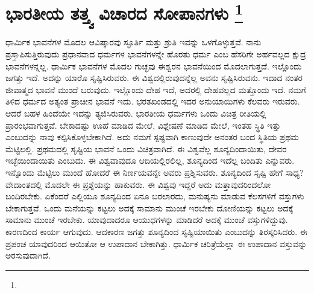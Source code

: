 
\chapter[ಭಾರತೀಯ ತತ್ತ್ವ ವಿಚಾರದ ಸೋಪಾನಗಳು ]{ಭಾರತೀಯ ತತ್ತ್ವ ವಿಚಾರದ ಸೋಪಾನಗಳು \protect\footnote{}}

ಧಾರ್ಮಿಕ ಭಾವನೆಗಳ ಮೊದಲ ಆವಿಷ್ಕಾರವು ಸ್ಫೂರ್ತಿ ಮತ್ತು ಶ್ರುತಿ ಇವನ್ನು ಒಳಗೊಳ್ಳುತ್ತವೆ. ನಾನು ಪ್ರಸ್ತಾಪಿಸುತ್ತಿರುವುದು ಪ್ರಧಾನವಾದ ಧರ್ಮಗಳ ಭಾವನೆಗಳನ್ನೇ ಹೊರತು ಧರ್ಮ ಎಂಬ ಹೆಸರಿಗೇ ಅರ್ಹವಲ್ಲದ ಕ್ಷುದ್ರ ಭಾವನೆಗಳನ್ನಲ್ಲ. ಧಾರ್ಮಿಕ ಭಾವನೆಗಳ ಮೊದಲ ಗುಚ್ಛವು ಈಶ್ವರನ ಭಾವನೆಯಿಂದ ಮೊದಲಾಗುತ್ತದೆ. ಇಲ್ಲೊಂದು ಜಗತ್ತು ಇದೆ. ಅದನ್ನು ಯಾರೊ ಸೃಷ್ಟಿಸಿರುವರು. ಈ ವಿಶ್ವದಲ್ಲಿರುವುದನ್ನೆಲ್ಲ ಅವನು ಸೃಷ್ಟಿಸಿರುವನು. ಇದಾದ ನಂತರ ಜೀವಾತ್ಮದ ಭಾವನೆ ಮುಂದೆ ಬರುವುದು. ಇಲ್ಲೊಂದು ದೇಹ ಇದೆ, ಅದರಲ್ಲಿ ದೇಹವಲ್ಲದ ಮತ್ತೊಂದು ಇದೆ. ನಮಗೆ ತಿಳಿದ ಧರ್ಮದ ಅತ್ಯಂತ ಪ್ರಾಚೀನ ಭಾವನೆ ಇದು. ಭರತಖಂಡದಲ್ಲಿ ಇದರ ಅನುಯಾಯಿಗಳು ಕೆಲವರು ಇರುವರು. ಆದರೆ ಬಹಳ ಹಿಂದೆಯೇ ಇದನ್ನು ತ್ಯಜಿಸಿರುವರು. ಭಾರತೀಯ ಧರ್ಮಗಳು ಒಂದು ವಿಚಿತ್ರ ರೀತಿಯಲ್ಲಿ ಪ್ರಾರಂಭವಾಗುತ್ತವೆ. ಬೇಕಾದಷ್ಟು ಊಹೆ ಮಾಡಿದ ಮೇಲೆ, ವಿಶ್ಲೇಷಣೆ ಮಾಡಿದ ಮೇಲೆ, ಇಂತಹ ಸ್ಥಿತಿ ಇತ್ತು ಎಂಬುದನ್ನು ನಾವು ಕಲ್ಪಿಸಿಕೊಳ್ಳಬೇಕಾಗಿದೆ. ಅದು ನಮಗೆ ಸ್ಪಷ್ಟವಾಗಿ ಕಾಣುವುದೇ ಅನಂತರ ಬಂದ ಸ್ಥಿತಿಯ ಪ್ರಥಮ ಮೆಟ್ಟಿಲಲ್ಲಿ. ಪ್ರಥಮದಲ್ಲಿ ಸೃಷ್ಟಿಯ ಭಾವನೆ ಒಂದು ವಿಚಿತ್ರವಾಗಿದೆ. ಈ ವಿಶ್ವವೆಲ್ಲ ಶೂನ್ಯದಿಂದಾಯಿತು, ದೇವರ ಇಚ್ಛೆಯಿಂದಾಯಿತು ಎಂಬುದು. ಈ ವಿಶ್ವವಾವುದೂ ಆದಿಯಲ್ಲಿರಲಿಲ್ಲ, ಶೂನ್ಯದಿಂದ ಇದೆಲ್ಲ ಬಂದಿತು ಎನ್ನುವರು. ಇನ್ನೊಂದು ಮೆಟ್ಟಿಲು ಮುಂದೆ ಹೋದರೆ ಈ ನಿರ್ಣಯವನ್ನೇ ಅವರು ಪ್ರಶ್ನಿಸುವರು. ಶೂನ್ಯದಿಂದ ಸೃಷ್ಟಿ ಹೇಗೆ ಸಾಧ್ಯ? ವೇದಾಂತದಲ್ಲಿ ಮೊದಲೇ ಈ ಪ್ರಶ್ನೆಯನ್ನು ಹಾಕುವರು. ಈ ವಿಶ್ವವು ಇದ್ದರೆ ಅದು ಮತ್ತಾವುದರಿಂದಲೋ ಬಂದಿರಬೇಕು. ಏಕೆಂದರೆ ಎಲ್ಲಿಯೂ ಶೂನ್ಯದಿಂದ ಏನೂ ಬರಲಾರದು, ಮನುಷ್ಯನು ಮಾಡುವ ಕೆಲಸಗಳಿಗೆ ವಸ್ತುಗಳು ಬೇಕಾಗುತ್ತವೆ. ಒಂದು ಮನೆಯನ್ನು ಕಟ್ಟಲು ಅದಕ್ಕೆ ಸಾಮಾನು ಮುಂಚೆ ಇರಬೇಕು ದೋಣಿಯನ್ನು ಕಟ್ಟಲು ಅದಕ್ಕೆ ಸಾಮಾನು ಮುಂಚೆ ಇರಬೇಕು. ಯಾವುದಾದರೂ ಆಯುಧಗಳನ್ನು ಮಾಡಿದರೆ ಅದಕ್ಕೆ ಮುಂಚೆ ವಸ್ತುಗಳಿದ್ದುವು. ಕಾರಣದಿಂದ ಕಾರ್ಯ ಆಗುವುದು. ಆದಕಾರಣ ಜಗತ್ತು ಶೂನ್ಯದಿಂದ ಸೃಷ್ಟಿಯಾಯಿತು ಎಂಬುದನ್ನು ತಿರಸ್ಕರಿಸಿದರು. ಈ ಪ್ರಪಂಚ ಯಾವುದರಿಂದ ಆಯಿತೋ ಆ ಉಪಾದಾನ ಬೇಕಾಗಿತ್ತು. ಧಾರ್ಮಿಕ ಚರಿತ್ರೆಯೆಲ್ಲಾ ಈ ಉಪಾದಾನ ವಸ್ತುವನ್ನು ಅರಸುವುದಾಗಿದೆ.

